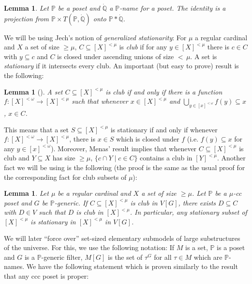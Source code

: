 \documentclass[12pt]{amsart}
\theoremstyle{definition}
\theoremstyle{remark}
\theoremstyle{plain}
\newtheorem{mylem}[mydef]{Lemma}
\numberwithin{mydef}{section}
\newcommand{\dP}{\mathbb{P}}
\newcommand{\dQ}{\mathbb{Q}}
\begin{document}
	\begin{mylem}
		Let $\dP$ be a poset and $\dot{\dQ}$ a $\dP$-name for a poset. The identity is a projection from $\dP\times T(\dP,\dot{\dQ})$ onto $\dP*\dot{\dQ}$.
	\end{mylem}
	
	We will be using Jech's notion of \emph{generalized stationarity}: For $\mu$ a regular cardinal and $X$ a set of size $\geq\mu$, $C\subseteq[X]^{<\mu}$ is \emph{club} if for any $y\in[X]^{<\mu}$ there is $c\in C$ with $y\subseteq c$ and $C$ is closed under ascending unions of size ${<}\,\mu$. A set is \emph{stationary} if it intersects every club. An important (but easy to prove) result is the following:
	
	\begin{mylem}[{\cite[Theorem 1.5]{MenasStrongCSuperC}}]
		A set $C\subseteq[X]^{<\mu}$ is club if and only if there is a function $f\colon[X]^{<\omega}\to[X]^{<\mu}$ such that whenever $x\in[X]^{<\mu}$ and $\bigcup_{y\in[x]^{<\omega}}f(y)\subseteq x$, $x\in C$.
	\end{mylem}
	
	This means that a set $S\subseteq[X]^{<\mu}$ is stationary if and only if whenever $f\colon[X]^{<\omega}\to[X]^{<\mu}$, there is $x\in S$ which is closed under $f$ (i.e. $f(y)\subseteq x$ for any $y\in[x]^{<\omega}$). Moreover, Menas' result implies that whenever $C\subseteq[X]^{<\mu}$ is club and $Y\subseteq X$ has size $\geq\mu$, $\{c\cap Y\;|\;c\in C\}$ contains a club in $[Y]^{<\mu}$. Another fact we will be using is the following (the proof is the same as the usual proof for the corresponding fact for club subsets of $\mu$):
	
	\begin{mylem}\label{StatPres}
		Let $\mu$ be a regular cardinal and $X$ a set of size $\geq\mu$. Let $\dP$ be a $\mu$-cc poset and $G$ be $\dP$-generic. If $C\subseteq[X]^{<\mu}$ is club in $V[G]$, there exists $D\subseteq C$ with $D\in V$ such that $D$ is club in $[X]^{<\mu}$. In particular, any stationary subset of $[X]^{<\mu}$ is stationary in $[X]^{<\mu}$ in $V[G]$.
	\end{mylem}
	
	We will later ``force over'' set-sized elementary submodels of large substructures of the universe. For this, we use the following notation: If $M$ is a set, $\dP$ is a poset and $G$ is a $\dP$-generic filter, $M[G]$ is the set of $\tau^G$ for all $\tau\in M$ which are $\dP$-names. We have the following statement which is proven similarly to the result that any ccc poset is proper:
\end{document}
